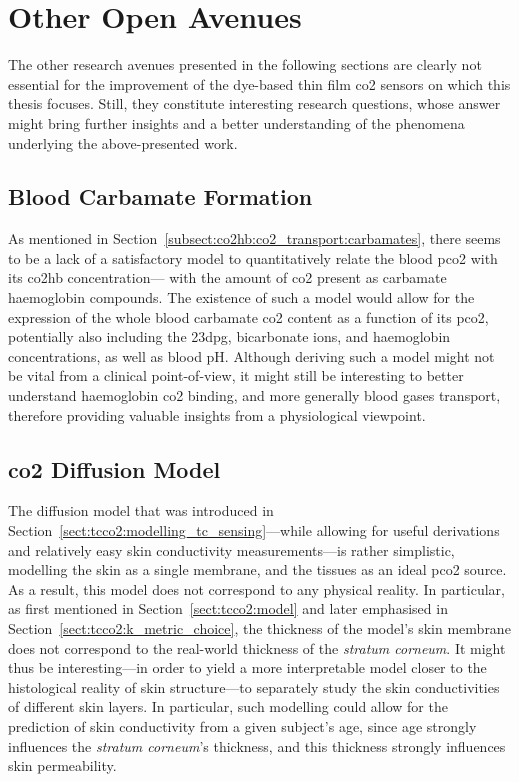 \section{Other Open Avenues}\label{sect:conclusion:others}

The other research avenues presented in the following sections are clearly not essential for the improvement of the dye-based thin film \gls{co2} sensors on which this thesis focuses. Still, they constitute interesting research questions, whose answer might bring further insights and a better understanding of the phenomena underlying the above-presented work.

\subsection{Blood Carbamate Formation}

As mentioned in Section~\ref{subsect:co2hb:co2_transport:carbamates}, there seems to be a lack of a satisfactory model to quantitatively relate the blood \gls{pco2} with its \gls{co2hb} concentration---\ie{} with the amount of \gls{co2} present as carbamate haemoglobin compounds. The existence of such a model would allow for the expression of the whole blood carbamate \gls{co2} content as a function of its \gls{pco2}, potentially also including the \gls{23dpg}, bicarbonate ions, and haemoglobin concentrations, as well as blood pH. Although deriving such a model might not be vital from a clinical point-of-view, it might still be interesting to better understand haemoglobin \gls{co2} binding, and more generally blood gases transport, therefore providing valuable insights from a physiological viewpoint.

\subsection{\texorpdfstring{\gls{co2}}{CO2} Diffusion Model}

The diffusion model that was introduced in Section~\ref{sect:tcco2:modelling_tc_sensing}---while allowing for useful derivations and relatively easy skin conductivity measurements---is rather simplistic, modelling the skin as a single membrane, and the tissues as an ideal \gls{pco2} source. As a result, this model does not correspond to any physical reality. In particular, as first mentioned in Section~\ref{sect:tcco2:model} and later emphasised in Section~\ref{sect:tcco2:k_metric_choice}, the thickness of the model's skin membrane does not correspond to the real-world thickness of the \textit{stratum corneum}. It might thus be interesting---in order to yield a more interpretable model closer to the histological reality of skin structure---to separately study the skin conductivities of different skin layers. In particular, such modelling could allow for the prediction of skin conductivity from a given subject's age, since age strongly influences the \textit{stratum corneum}'s thickness\cite{branchet1990}, and this thickness strongly influences skin permeability\cite{scheuplein1976}.

